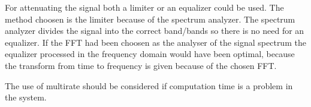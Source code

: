 For attenuating the signal both a limiter or an equalizer could be used. The method choosen is the limiter because of the spectrum analyzer. The spectrum analyzer divides the signal into the correct band/bands so there is no need for an equalizer. If the FFT had been choosen as the analyser of the signal spectrum the equalizer processed in the frequency domain would have been optimal, because the transform from time to frequency is given because of the chosen FFT. 

The use of multirate should be considered if computation time is a problem in the system.






